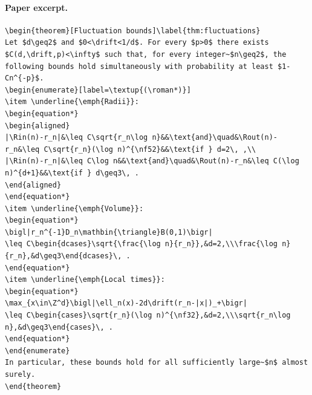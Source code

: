 \paragraph{Paper excerpt.}
\begin{verbatim}
\begin{theorem}[Fluctuation bounds]\label{thm:fluctuations}
Let $d\geq2$ and $0<\drift<1/d$. For every $p>0$ there exists $C(d,\drift,p)<\infty$ such that, for every integer~$n\geq2$, the following bounds hold simultaneously with probability at least $1-Cn^{-p}$.
\begin{enumerate}[label=\textup{(\roman*)}]
\item \underline{\emph{Radii}}:
\begin{equation*}
\begin{aligned}
|\Rin(n)-r_n|&\leq C\sqrt{r_n\log n}&&\text{and}\quad&\Rout(n)-r_n&\leq C\sqrt{r_n}(\log n)^{\nf52}&&\text{if } d=2\, ,\\
|\Rin(n)-r_n|&\leq C\log n&&\text{and}\quad&\Rout(n)-r_n&\leq C(\log n)^{d+1}&&\text{if } d\geq3\, .
\end{aligned}
\end{equation*}
\item \underline{\emph{Volume}}:
\begin{equation*}
\bigl|r_n^{-1}D_n\mathbin{\triangle}B(0,1)\bigr|
\leq C\begin{dcases}\sqrt{\frac{\log n}{r_n}},&d=2,\\\frac{\log n}{r_n},&d\geq3\end{dcases}\, .
\end{equation*}
\item \underline{\emph{Local times}}:
\begin{equation*}
\max_{x\in\Z^d}\bigl|\ell_n(x)-2d\drift(r_n-|x|)_+\bigr|
\leq C\begin{cases}\sqrt{r_n}(\log n)^{\nf32},&d=2,\\\sqrt{r_n\log n},&d\geq3\end{cases}\, .
\end{equation*}
\end{enumerate}
In particular, these bounds hold for all sufficiently large~$n$ almost surely. 
\end{theorem}
\end{verbatim}
